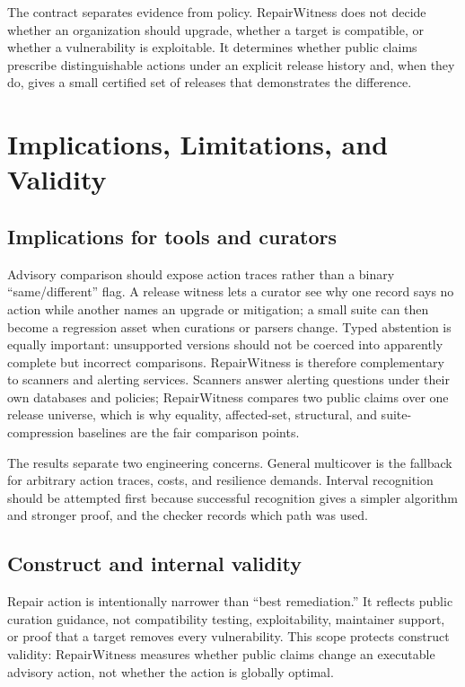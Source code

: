 \documentclass[10pt,conference]{IEEEtran}
\begin{document}
The contract separates evidence from policy. RepairWitness does not decide whether an organization should upgrade, whether a target is compatible, or whether a vulnerability is exploitable. It determines whether public claims prescribe distinguishable actions under an explicit release history and, when they do, gives a small certified set of releases that demonstrates the difference.

\section{Implications, Limitations, and Validity}
\subsection{Implications for tools and curators}
Advisory comparison should expose action traces rather than a binary ``same/different'' flag. A release witness lets a curator see why one record says no action while another names an upgrade or mitigation; a small suite can then become a regression asset when curations or parsers change. Typed abstention is equally important: unsupported versions should not be coerced into apparently complete but incorrect comparisons. RepairWitness is therefore complementary to scanners and alerting services. Scanners answer alerting questions under their own databases and policies; RepairWitness compares two public claims over one release universe, which is why equality, affected-set, structural, and suite-compression baselines are the fair comparison points.

The results separate two engineering concerns. General multicover is the fallback for arbitrary action traces, costs, and resilience demands. Interval recognition should be attempted first because successful recognition gives a simpler algorithm and stronger proof, and the checker records which path was used.

\subsection{Construct and internal validity}
Repair action is intentionally narrower than ``best remediation.'' It reflects public curation guidance, not compatibility testing, exploitability, maintainer support, or proof that a target removes every vulnerability. This scope protects construct validity: RepairWitness measures whether public claims change an executable advisory action, not whether the action is globally optimal.
\end{document}
